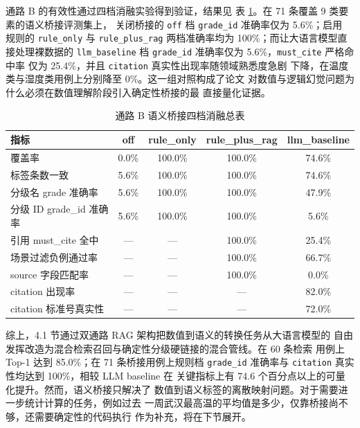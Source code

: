 \documentclass[a4paper]{article}
\newcommand{\song}{\CJKfamily{song}}
\newcommand{\wuhao}{\fontsize{10.5pt}{18pt}\selectfont}
\theoremstyle{definition}
\theoremstyle{plain}
\theoremstyle{remark}
\newcommand{\reftab}[1]{表 \ref{#1}}
\newcommand{\bk}{\discretionary{}{}{}}
\begin{document}
通路 B 的有效性通过四档消融实验得到验证，结果见
\reftab{tab:bridge-ablation}。在 71 条覆盖 9 类要素的语义桥接评测集上，
关闭桥接的 \texttt{off} 档 \texttt{grade\_\bk{}id} 准确率仅为 5.6\%；启用
规则的 \texttt{rule\_\bk{}only} 与 \texttt{rule\_\bk{}plus\_\bk{}rag} 两档准确率均为
100\%；而让大语言模型直接处理裸数据的 \texttt{llm\_\bk{}baseline} 档
\texttt{grade\_\bk{}id} 准确率仅为 5.6\%，\texttt{must\_\bk{}cite} 严格命中率
仅为 25.4\%，并且 \texttt{citation} 真实性出现率随领域熟悉度急剧
下降，在温度类与湿度类用例上分别降至 0\%。这一组对照构成了论文
对数值与逻辑幻觉问题为什么必须在数值理解阶段引入确定性桥接的最
直接量化证据。

\begin{table}[!ht]
    \centering
    \caption{通路 B 语义桥接四档消融总表}
    \label{tab:bridge-ablation}
    \song\wuhao
    \begin{tabular}{lcccc}
        \toprule
        指标 & off & rule\_only & rule\_plus\_rag & llm\_baseline \\
        \midrule
        覆盖率 & 0.0\% & 100.0\% & 100.0\% & 74.6\% \\
        标签条数一致 & 5.6\% & 100.0\% & 100.0\% & 74.6\% \\
        分级名 grade 准确率 & 5.6\% & 100.0\% & 100.0\% & 47.9\% \\
        分级 ID grade\_id 准确率 & 5.6\% & 100.0\% & 100.0\% & 5.6\% \\
        引用 must\_cite 全中 & --- & --- & 100.0\% & 25.4\% \\
        场景过滤负例通过率 & --- & --- & 100.0\% & 66.7\% \\
        source 字段匹配率 & --- & --- & 100.0\% & 0.0\% \\
        citation 出现率 & --- & --- & --- & 82.0\% \\
        citation 标准号真实性 & --- & --- & --- & 72.0\% \\
        \bottomrule
    \end{tabular}
\end{table}

综上，4.1 节通过双通路 RAG 架构把数值到语义的转换任务从大语言模型的
自由发挥改造为混合检索召回与确定性分级硬链接的混合管线。在 60 条检索
用例上 Top-1 达到 85.0\%；在 71 条桥接用例上规则档 \texttt{grade\_\bk{}id}
准确率与 \texttt{citation} 真实性均达到 100\%，相较 LLM baseline 在
关键指标上有 74.6 个百分点以上的可量化提升。然而，语义桥接只解决了
数值到语义标签的离散映射问题。对于需要进一步统计计算的任务，例如过去
一周武汉最高温的平均值是多少，仅靠桥接尚不够，还需要确定性的代码执行
作为补充，将在下节展开。
\end{document}
